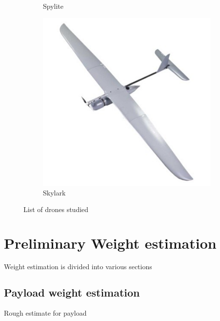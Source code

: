 \documentclass[12 pt]{article}
\begin{document}
\begin{figure}[h!]
\begin{subfigure}{.4\textwidth}
        \caption{Spylite}
        \label{Spylite}
    \end{subfigure}
    \centering
    \begin{subfigure}{.4\textwidth}
        \centering
        \includegraphics[width = 0.8\linewidth]{Aircraft pics/Skylark.jpg}
        \caption{Skylark}
        \label{Skylark}
    \end{subfigure}
    \caption{List of drones studied}
    \label{Drone pictures}
\end{figure}


\vspace{\fill}

\newpage



\section{Preliminary Weight estimation}

Weight estimation is divided into various sections
\subsection{Payload weight estimation}
Rough estimate for payload
\begin{table}[h]
\centering
{}
\caption{Payload weight estimate}
\label{Payload weight}
\end{table}
\end{document}
